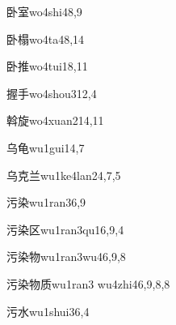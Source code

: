 \begin{verbete}{卧室}{wo4shi4}{8,9}
\end{verbete}

\begin{verbete}{卧榻}{wo4ta4}{8,14}
\end{verbete}

\begin{verbete}{卧推}{wo4tui1}{8,11}
\end{verbete}

\begin{verbete}{握手}{wo4shou3}{12,4}
\end{verbete}

\begin{verbete}{斡旋}{wo4xuan2}{14,11}
\end{verbete}

\begin{verbete}{乌龟}{wu1gui1}{4,7}
\end{verbete}

\begin{verbete}{乌克兰}{wu1ke4lan2}{4,7,5}
\end{verbete}

\begin{verbete}{污染}{wu1ran3}{6,9}
\end{verbete}

\begin{verbete}{污染区}{wu1ran3qu1}{6,9,4}
\end{verbete}

\begin{verbete}{污染物}{wu1ran3wu4}{6,9,8}
\end{verbete}

\begin{verbete}{污染物质}{wu1ran3 wu4zhi4}{6,9,8,8}
\end{verbete}

\begin{verbete}{污水}{wu1shui3}{6,4}
\end{verbete}

